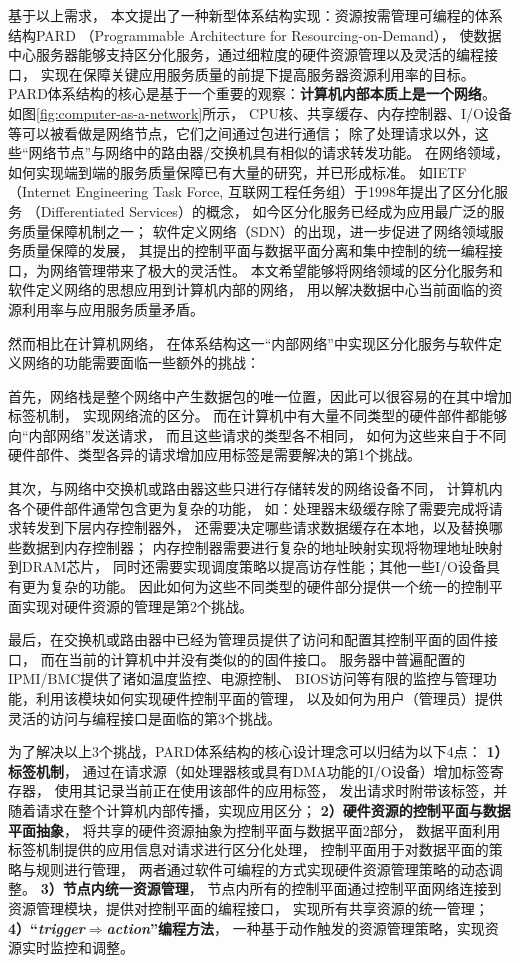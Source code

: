 基于以上需求，
本文提出了一种新型体系结构实现：资源按需管理可编程的体系结构PARD
（Programmable Architecture for Resourcing-on-Demand）\cite{pard:2015}，
使数据中心服务器能够支持区分化服务，通过细粒度的硬件资源管理以及灵活的编程接口，
实现在保障关键应用服务质量的前提下提高服务器资源利用率的目标。
PARD体系结构的核心是基于一个重要的观察：\textbf{计算机内部本质上是一个网络}。
如图\ref{fig:computer-as-a-network}所示，
CPU核、共享缓存、内存控制器、I/O设备等可以被看做是网络节点，它们之间通过包进行通信；
除了处理请求以外，这些``网络节点''与网络中的路由器/交换机具有相似的请求转发功能。
在网络领域，如何实现端到端的服务质量保障已有大量的研究，并已形成标准。
如IETF（Internet Engineering Task Force, 互联网工程任务组）于1998年提出了区分化服务
（Differentiated Services）\cite{DiffServ}的概念，
如今区分化服务已经成为应用最广泛的服务质量保障机制之一；
软件定义网络（SDN）\cite{SDN}的出现，进一步促进了网络领域服务质量保障的发展，
其提出的控制平面与数据平面分离和集中控制的统一编程接口，为网络管理带来了极大的灵活性。
本文希望能够将网络领域的区分化服务和软件定义网络的思想应用到计算机内部的网络，
用以解决数据中心当前面临的资源利用率与应用服务质量矛盾。

然而相比在计算机网络，
在体系结构这一``内部网络''中实现区分化服务与软件定义网络的功能需要面临一些额外的挑战：

首先，网络栈是整个网络中产生数据包的唯一位置，因此可以很容易的在其中增加标签机制，
实现网络流的区分。
而在计算机中有大量不同类型的硬件部件都能够向``内部网络''发送请求，
而且这些请求的类型各不相同，
如何为这些来自于不同硬件部件、类型各异的请求增加应用标签是需要解决的第1个挑战。

其次，与网络中交换机或路由器这些只进行存储转发的网络设备不同，
计算机内各个硬件部件通常包含更为复杂的功能，
如：处理器末级缓存除了需要完成将请求转发到下层内存控制器外，
还需要决定哪些请求数据缓存在本地，以及替换哪些数据到内存控制器；
内存控制器需要进行复杂的地址映射实现将物理地址映射到DRAM芯片，
同时还需要实现调度策略以提高访存性能；其他一些I/O设备具有更为复杂的功能。
因此如何为这些不同类型的硬件部分提供一个统一的控制平面实现对硬件资源的管理是第2个挑战。

最后，在交换机或路由器中已经为管理员提供了访问和配置其控制平面的固件接口，
而在当前的计算机中并没有类似的的固件接口。
服务器中普遍配置的IPMI/BMC\cite{ipmi}提供了诸如温度监控、电源控制、
BIOS访问等有限的监控与管理功能，利用该模块如何实现硬件控制平面的管理，
以及如何为用户（管理员）提供灵活的访问与编程接口是面临的第3个挑战。

为了解决以上3个挑战，PARD体系结构的核心设计理念可以归结为以下4点：
\textbf{1）标签机制}，
通过在请求源（如处理器核或具有DMA功能的I/O设备）增加标签寄存器，
使用其记录当前正在使用该部件的应用标签，
发出请求时附带该标签，并随着请求在整个计算机内部传播，实现应用区分；
\textbf{2）硬件资源的控制平面与数据平面抽象}，
将共享的硬件资源抽象为控制平面与数据平面2部分，
数据平面利用标签机制提供的应用信息对请求进行区分化处理，
控制平面用于对数据平面的策略与规则进行管理，
两者通过软件可编程的方式实现硬件资源管理策略的动态调整。
\textbf{3）节点内统一资源管理}，
节点内所有的控制平面通过控制平面网络连接到资源管理模块，提供对控制平面的编程接口，
实现所有共享资源的统一管理；
\textbf{4）``\emph{trigger$\Rightarrow$action}''编程方法}，
一种基于动作触发的资源管理策略，实现资源实时监控和调整。

